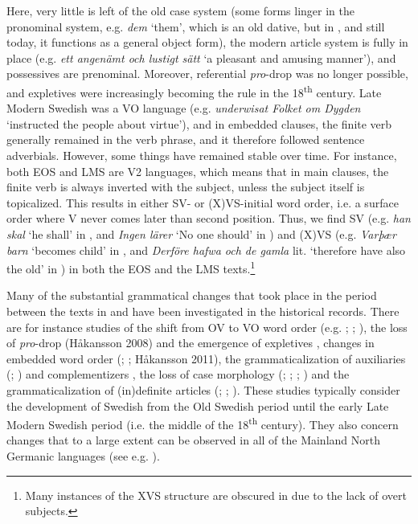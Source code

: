\documentclass[output=paper]{langscibook}
\begin{document}
Here, very little is left of the old case system (some forms linger in the pronominal system, e.g. \textit{dem} ‘them’, which is an old dative, but in , and still today, it functions as a general object form), the modern article system is fully in place (e.g. \textit{ett angenämt och lustigt sätt} ‘a pleasant and amusing manner’), and possessives are prenominal. Moreover, referential \textit{pro}{}-drop was no longer possible, and expletives were increasingly becoming the rule in the 18\textsuperscript{th} century. Late Modern Swedish was a VO language (e.g. \textit{underwisat Folket om Dygden} ‘instructed the people about virtue’), and in embedded clauses, the finite verb generally remained in the verb phrase, and it therefore followed sentence adverbials. However, some things have remained stable over time. For instance, both EOS and LMS are V2 languages, which means that in main clauses, the finite verb is always inverted with the subject, unless the subject itself is topicalized. This results in either SV- or (X)VS-initial word order, i.e. a surface order where V never comes later than second position. Thus, we find SV (e.g. \textit{han skal} ‘he shall’ in , and \textit{Ingen lärer} ‘No one should’ in ) and (X)VS (e.g. \textit{Varþær barn} ‘becomes child’ in , and \textit{Derföre hafwa och de gamla} lit. ‘therefore have also the old’ in ) in both the EOS and the LMS texts.\footnote{Many instances of the XVS structure are obscured in  due to the lack of overt subjects.}



Many of the substantial grammatical changes that took place in the period between the texts in  and  have been investigated in the historical records. There are for instance studies of the shift from OV to VO word order (e.g. \citealt{Delsing1999}; \citealt{Petzell2011}; \citealt{Sangfelt2019}), the loss of \textit{pro}{}-drop (Håkansson 2008) and the emergence of expletives \citep{Falk1993}, changes in embedded word order (\citealt{Platzack1988centralskandinaviska}; \citealt{Falk1993}; Håkansson 2011), the grammaticalization of auxiliaries (\citealt{Andersson2007}; \citealt{Bylin2013}) and complementizers \citep{Rosenkvist2004}, the loss of case morphology (\citealt{Delsing1991,Delsing2014Studier,Delsing1991}; \citealt{Norde1997}; \citealt{Falk1997}; \citealt{Skrzypek2005}) and the grammaticalization of (in)definite articles (\citealt{Skrzypek2009}; \citealt{BrandtlerDelsing2010}; \citealt{Stroh-Wollin2016}). These studies typically consider the development of Swedish from the Old Swedish period until the early Late Modern Swedish period (i.e. the middle of the 18\textsuperscript{th} century). They also concern changes that to a large extent can be observed in all of the Mainland North Germanic languages (see e.g. \citealt{HolmbergPlatzack1995}).
\end{document}
